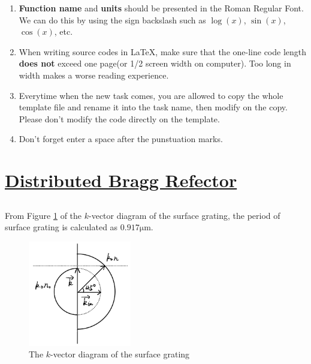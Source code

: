\documentclass[fontsize=11pt]{scrartcl}
\begin{document}
\begin{enumerate}
    \item  \textbf{Function name} and \textbf{units} should be presented in the Roman Regular Font.
    We can do this by using the sign backslash such as $\log(x)$, $\sin(x)$, $\cos(x)$, etc.
    \item When writing source codes in \LaTeX, make sure that the one-line code length 
    \textbf{does not} exceed one page(or 1/2 screen width on computer). Too long in width makes 
    a worse reading experience.
    \item Everytime when the new task comes, you are allowed to copy the whole template file and 
    rename it into the task name, then modify on the copy. Please don't modify the code directly
    on the template.
    \item Don't forget enter a space after the punstuation marks.
\end{enumerate}



\pagebreak
\section{\uline{Distributed Bragg Refector}}
\subsection{}
From Figure \ref{fig1.1} of the $k$-vector diagram of the surface grating, 
the period of surface grating is calculated as $0.917\mathrm{\mu m}$.
\begin{figure}[H]
    \centering
     \includegraphics[width=0.4\textwidth]{img/fig1.1.png}
     \caption{The $k$-vector diagram of the surface grating}
     \label{fig1.1}
\end{figure}
\end{document}
